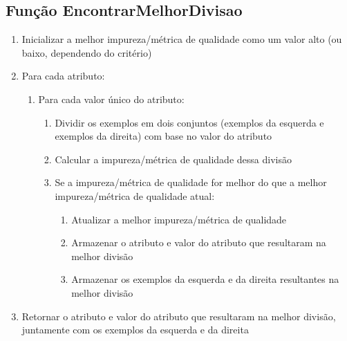 \documentclass[12pt,a4paper, brazil]{article}
\begin{document}
\subsection{Função EncontrarMelhorDivisao}
\begin{enumerate}
  \item Inicializar a melhor impureza/métrica de qualidade como um valor alto (ou baixo, dependendo do critério)
  \item Para cada atributo:
  \begin{enumerate}
    \item Para cada valor único do atributo:
    \begin{enumerate}
      \item Dividir os exemplos em dois conjuntos (exemplos da esquerda e exemplos da direita) com base no valor do atributo
      \item Calcular a impureza/métrica de qualidade dessa divisão
      \item Se a impureza/métrica de qualidade for melhor do que a melhor impureza/métrica de qualidade atual:
      \begin{enumerate}
        \item Atualizar a melhor impureza/métrica de qualidade
        \item Armazenar o atributo e valor do atributo que resultaram na melhor divisão
        \item Armazenar os exemplos da esquerda e da direita resultantes na melhor divisão
      \end{enumerate}
    \end{enumerate}
  \end{enumerate}
  \item Retornar o atributo e valor do atributo que resultaram na melhor divisão, juntamente com os exemplos da esquerda e da direita
\end{enumerate}
\end{document}

